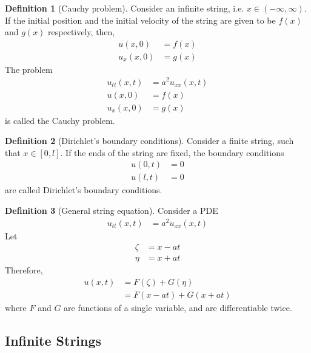\documentclass[titlepage, fleqn, a4paper, 12pt, twoside]{article}
\theoremstyle{definition}
\newtheorem{definition}{Definition}
\theoremstyle{theorem}
\begin{document}
\begin{definition}[Cauchy problem]
	Consider an infinite string, i.e. $x \in (-\infty,\infty)$.
	If the initial position and the initial velocity of the string are given to be $f(x)$ and $g(x)$ respectively, then,
	\begin{align*}
		u(x,0)   & = f(x) \\
		u_x(x,0) & = g(x)
	\end{align*}
	The problem
	\begin{align*}
		u_{t t}(x,t) & = a^2 u_{x x}(x,t) \\
		u(x,0)       & = f(x)             \\
		u_x(x,0)     & = g(x)
	\end{align*}
	is called the Cauchy problem.
\end{definition}

\begin{definition}[Dirichlet's boundary conditions]
	Consider a finite string, such that $x \in [0,l]$.
	If the ends of the string are fixed, the boundary conditions
	\begin{align*}
		u(0,t) & = 0 \\
		u(l,t) & = 0
	\end{align*}
	are called Dirichlet's boundary conditions.
\end{definition}

\begin{definition}[General string equation]
	Consider a PDE
	\begin{align*}
		u_{t t}(x,t) & = a^2 u_{x x}(x,t)
	\end{align*}
	Let
	\begin{align*}
		\zeta & = x - a t \\
		\eta  & = x + a t
	\end{align*}
	Therefore,
	\begin{align*}
		u(x,t) & = F(\zeta) + G(\eta) \\
                       & = F(x - a t) + G(x + a t)
	\end{align*}
	where $F$ and $G$ are functions of a single variable, and are differentiable twice.
\end{definition}

\subsection{Infinite Strings}
\end{document}
